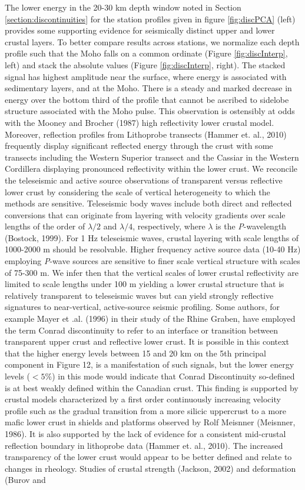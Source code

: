 \documentclass[review]{elsarticle}
\begin{document}
The lower energy in the 20-30 km depth window noted in Section \ref{section:discontinuities} for the station profiles given in figure \ref{fig:discPCA} (left) provides some supporting evidence for seismically distinct upper and lower crustal layers. To better compare results across stations, we normalize each depth profile such that the Moho falls on a common ordinate (Figure \ref{fig:discInterp}, left) and stack the absolute values (Figure \ref{fig:discInterp}, right). The stacked signal has highest amplitude near the surface, where energy is associated with sedimentary layers, and at the Moho. There is a steady and marked decrease in energy over the bottom third of the profile that cannot be ascribed to sidelobe structure associated with the Moho pulse. This observation is ostensibly at odds with the Mooney and Brocher (1987) high reflectivity lower crustal model. Moreover, reflection profiles from {\sc Lithoprobe} transects (Hammer et. al., 2010) frequently display significant reflected energy through the crust with some transects including the Western Superior transect and the Cassiar in the Western Cordillera displaying pronounced reflectivity within the lower crust. We reconcile the teleseismic and active source observations of transparent versus reflective lower crust by considering the scale of vertical heterogeneity to which the methods are sensitive. Teleseismic body waves include both direct and reflected conversions that can originate from layering with velocity gradients over scale lengths of the order of $\lambda/2$ and $\lambda/4$, respectively, where $\lambda$ is the {\it P}-wavelength (Bostock, 1999). For 1 Hz teleseismic waves, crustal layering with scale lengths of 1000-2000 m should be resolvable. Higher frequency active source data (10-40 Hz) employing {\it P}-wave sources are sensitive to finer scale vertical structure with scales of 75-300 m. We infer then that the vertical scales of lower crustal reflectivity are limited to scale lengths under 100 m yielding a lower crustal structure that is relatively transparent to teleseismic waves but can yield strongly reflective signatures to near-vertical, active-source seismic profiling.  Some authors, for example Mayer et .al. (1996) in their study of the Rhine Graben, have employed the term Conrad discontinuity to refer to an interface or transition between transparent upper crust and reflective lower crust. It is possible in this context that the higher energy levels between 15 and 20 km on the 5th principal component in Figure 12, is a manifestation of such signals, but the lower energy levels ($<5\%$) in this mode would indicate that Conrad Discontinuity so-defined is at best weakly defined within the Canadian crust. This finding is supported by crustal models characterized by a first order continuously increasing velocity profile such as the gradual transition from a more silicic uppercrust to a more mafic lower crust in shields and platforms observed by Rolf Meisnner (Meisnner, 1986). It is also supported by the lack of evidence for a consistent mid-crustal reflection boundary in lithoprobe data (Hammer et. al., 2010). The increased transparency of the lower crust would appear to be better defined and relate to changes in rheology. Studies of crustal strength (Jackson, 2002) and deformation (Burov and 
\end{document}
